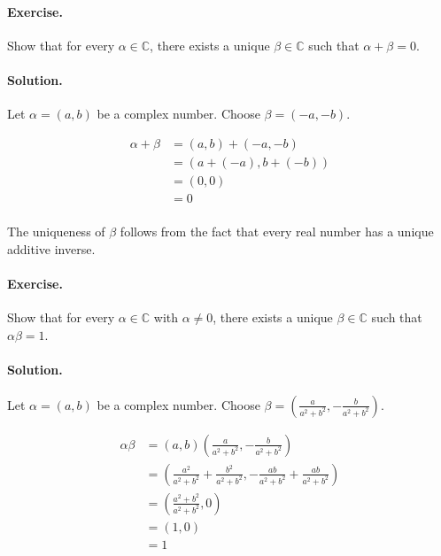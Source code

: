 \documentclass[12pt]{article}
\newenvironment{exercise}{\paragraph{Exercise.}}{}
\newenvironment{solution}{\paragraph{Solution.}}{}
\newcommand{\C}{\mathbb{C}}
\begin{document}
\begin{exercise}
  Show that for every $\alpha \in \C$, there exists a unique $\beta \in \C$
  such that $\alpha + \beta = 0$.
\end{exercise}

\begin{solution}
  Let $\alpha = (a, b)$ be a complex number. Choose $\beta = (-a, -b)$.

  \[
    \begin{split}
      \alpha + \beta & = (a, b) + (-a, -b)    \\
                     & = (a + (-a), b + (-b)) \\
                     & = (0, 0)               \\
                     & = 0                    \\
    \end{split}
  \]

  The uniqueness of $\beta$ follows from the fact that every real number has a
  unique additive inverse.
\end{solution}

\begin{exercise}
  Show that for every $\alpha \in \C$ with $\alpha \neq 0$, there exists a
  unique $\beta \in \C$ such that $\alpha\beta = 1$.
\end{exercise}

\begin{solution}
  Let $\alpha = (a, b)$ be a complex number. Choose $\beta = (\frac{a}{a^2 +
  b^2}, -\frac{b}{a^2 + b^2})$.

  \[
    \begin{split}
      \alpha\beta & = (a, b)\left(\frac{a}{a^2 + b^2}, -\frac{b}{a^2 + b^2}\right) \\
                  & = \left(\frac{a^2}{a^2 + b^2} + \frac{b^2}{a^2 + b^2},
                      -\frac{ab}{a^2 + b^2} + \frac{ab}{a^2 + b^2}\right)          \\
                  & = \left(\frac{a^2 + b^2}{a^2 + b^2}, 0\right)                  \\
                  & = (1, 0)                                                       \\
                  & = 1                                                            \\
    \end{split}
  \]
\end{solution}
\end{document}
